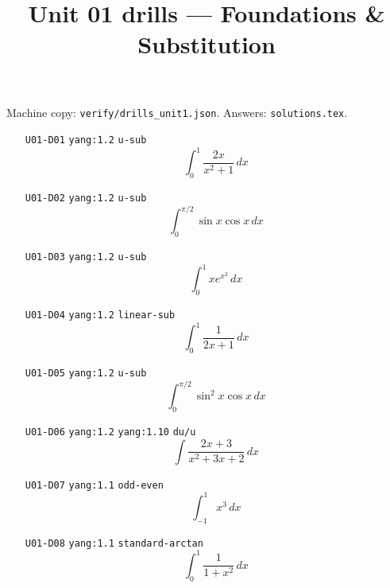 
\title{Unit 01 drills --- Foundations \& Substitution}
\author{}
\date{}

\maketitle
\noindent Machine copy: \texttt{verify/drills\_unit1.json}. Answers: \texttt{solutions.tex}.

\begin{enumerate}
\item[\texttt{U01-D01}] \texttt{yang:1.2} \texttt{u-sub}
\[ \int_0^1 \frac{2x}{x^2+1}\,dx \]
\item[\texttt{U01-D02}] \texttt{yang:1.2} \texttt{u-sub}
\[ \int_0^{\pi/2} \sin x\cos x\,dx \]
\item[\texttt{U01-D03}] \texttt{yang:1.2} \texttt{u-sub}
\[ \int_0^1 x e^{x^2}\,dx \]
\item[\texttt{U01-D04}] \texttt{yang:1.2} \texttt{linear-sub}
\[ \int_0^1 \frac{1}{2x+1}\,dx \]
\item[\texttt{U01-D05}] \texttt{yang:1.2} \texttt{u-sub}
\[ \int_0^{\pi/2} \sin^2 x\cos x\,dx \]
\item[\texttt{U01-D06}] \texttt{yang:1.2} \texttt{yang:1.10} \texttt{du/u}
\[ \int \frac{2x+3}{x^2+3x+2}\,dx \]
\item[\texttt{U01-D07}] \texttt{yang:1.1} \texttt{odd-even}
\[ \int_{-1}^{1} x^3\,dx \]
\item[\texttt{U01-D08}] \texttt{yang:1.1} \texttt{standard-arctan}
\[ \int_0^1 \frac{1}{1+x^2}\,dx \]
\end{enumerate}

